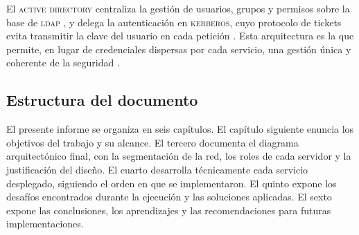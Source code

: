 El \textsc{active directory} centraliza la gesti\'on de usuarios, grupos y
permisos sobre la base de \textsc{ldap} \cite{rfc4511}, y delega la
autenticaci\'on en \textsc{kerberos}, cuyo protocolo de tickets evita
transmitir la clave del usuario en cada petici\'on \cite{rfc4120}. Esta
arquitectura es la que permite, en lugar de credenciales dispersas por
cada servicio, una gesti\'on \'unica y coherente de la seguridad
\cite{sambateam2024}.

\subsection{Estructura del documento}

El presente informe se organiza en seis cap\'itulos. El cap\'itulo
siguiente enuncia los objetivos del trabajo y su alcance. El tercero
documenta el diagrama arquitect\'onico final, con la segmentaci\'on de la
red, los roles de cada servidor y la justificaci\'on del dise\~no. El
cuarto desarrolla t\'ecnicamente cada servicio desplegado, siguiendo el
orden en que se implementaron. El quinto expone los desaf\'ios
encontrados durante la ejecuci\'on y las soluciones aplicadas. El sexto
expone las conclusiones, los aprendizajes y las recomendaciones para
futuras implementaciones.
